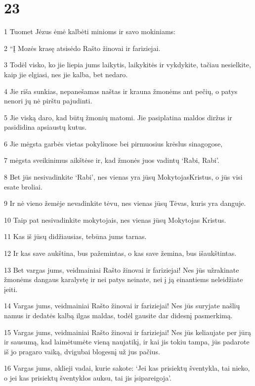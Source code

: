 \chapter{23}


\par 1 Tuomet Jėzus ėmė kalbėti minioms ir savo mokiniams: 
\par 2 “Į Mozės krasę atsisėdo Rašto žinovai ir fariziejai. 
\par 3 Todėl visko, ko jie liepia jums laikytis, laikykitės ir vykdykite, tačiau nesielkite, kaip jie elgiasi, nes jie kalba, bet nedaro. 
\par 4 Jie riša sunkias, nepanešamas naštas ir krauna žmonėms ant pečių, o patys nenori jų nė pirštu pajudinti. 
\par 5 Jie viską daro, kad būtų žmonių matomi. Jie pasiplatina maldos diržus ir pasididina apsiaustų kutus. 
\par 6 Jie mėgsta garbės vietas pokyliuose bei pirmuosius krėslus sinagogose, 
\par 7 mėgsta sveikinimus aikštėse ir, kad žmonės juos vadintų ‘Rabi, Rabi’. 
\par 8 Bet jūs nesivadinkite ‘Rabi’, nes vienas yra jūsų Mokytojas­Kristus, o jūs visi esate broliai. 
\par 9 Ir nė vieno žemėje nevadinkite tėvu, nes vienas jūsų Tėvas, kuris yra danguje. 
\par 10 Taip pat nesivadinkite mokytojais, nes vienas jūsų Mokytojas­ Kristus. 
\par 11 Kas iš jūsų didžiausias, tebūna jums tarnas. 
\par 12 Ir kas save aukština, bus pažemintas, o kas save žemina, bus išaukštintas. 
\par 13 Bet vargas jums, veidmainiai Rašto žinovai ir fariziejai! Nes jūs užrakinate žmonėms dangaus karalystę ir nei patys neinate, nei į ją einantiems neleidžiate įeiti. 
\par 14 Vargas jums, veidmainiai Rašto žinovai ir fariziejai! Nes jūs suryjate našlių namus ir dedatės kalbą ilgas maldas, todėl gausite dar didesnį pasmerkimą. 
\par 15 Vargas jums, veidmainiai Rašto žinovai ir fariziejai! Nes jūs keliaujate per jūrą ir sausumą, kad laimėtumėte vieną naujatikį, ir kai jis tokiu tampa, jūs padarote iš jo pragaro vaiką, dvigubai blogesnį už jus pačius. 
\par 16 Vargas jums, aklieji vadai, kurie sakote: ‘Jei kas prisiektų šventykla, tai nieko, o jei kas prisiektų šventyklos auksu, tai jis įsipareigoja’. 

